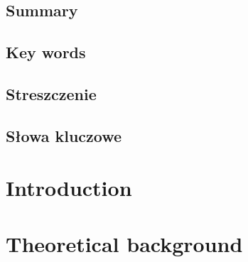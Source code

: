 \documentclass[12pt]{report}
\begin{document}
    
    \pagestyle{empty}
    \section*{Summary}
    \section*{Key words}
    \newpage
    \pagestyle{empty}
    \section*{Streszczenie}
    \section*{Słowa kluczowe}
    
    
    \tableofcontents
    
    
    \pagestyle{fancy}
    \chapter{Introduction} \label{ch:introduction} %
    
    \chapter{Theoretical background}
    


\end{document}
